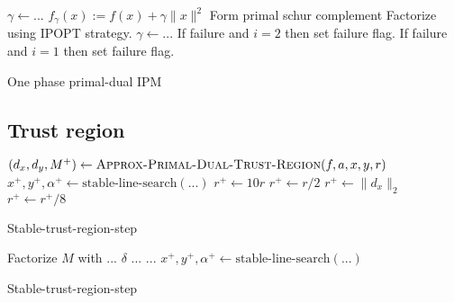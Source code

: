 \documentclass{article}
\begin{document}
\begin{algorithm}[H]
\begin{algorithmic}\label{AlgMain}
\State $\gamma \gets ...$
\State $f_{\gamma}(x) := f(x) + \gamma \| x \|^2$
\State Form primal schur complement 
\State Factorize using IPOPT strategy.
\State {}
\State $\gamma \gets ...$
\State If failure and $i = 2$ then set failure flag.
\Else
\State {}
\State If failure and $i = 1$ then set failure flag.
\EndIf
\EndFor
\EndFor
\EndFunction
\end{algorithmic}
\caption{One phase primal-dual IPM}
\end{algorithm}

\subsection{Trust region}

\begin{algorithm}[H]
\begin{algorithmic}
\State $(d_{x}, d_{y}, M^{+}) \gets  \Call{Approx-Primal-Dual-Trust-Region}{\obj, \cons, x, y, r}$
\State $x^{+}, y^{+}, \alpha^{+} \gets \text{stable-line-search}(...)$
\If{$\alpha^{+} > \alpha_{\min}$}
\State $r^{+} \gets 10 r$
\State $r^{+} \gets r / 2$
\Else
\State $r^{+} \gets \| d_{x} \|_{2}$
\EndIf
\State \algorithmicbreak
\EndIf
\State $r^{+} \gets r^{+} / 8$
\EndFor
\State {}
\EndFunction
\end{algorithmic}
\caption{Stable-trust-region-step}
\end{algorithm}

\begin{algorithm}[H]
\begin{algorithmic}
\State Factorize $M$ with ... $\delta$ ...
\State ...
\EndIf
\State $x^{+}, y^{+}, \alpha^{+} \gets \text{stable-line-search}(...)$
\EndFor
\State {}
\EndFunction
\end{algorithmic}
\caption{Stable-trust-region-step}
\end{algorithm}
\end{document}

